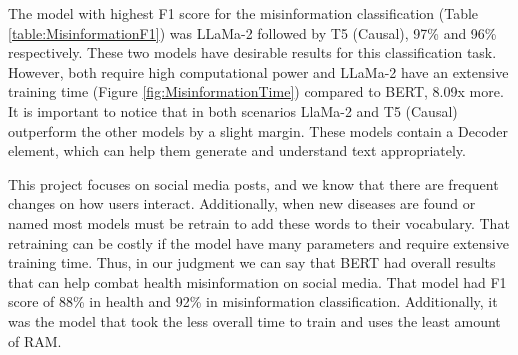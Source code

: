 The model with highest F1 score for the misinformation classification (Table \ref{table:MisinformationF1}) was LLaMa-2 followed by T5 (Causal), 97\% and 96\% respectively. These two models
have desirable results for this classification task. However, both require high computational power and LLaMa-2 have an extensive training time (Figure \ref{fig:MisinformationTime}) compared to BERT,
8.09x more. It is important to notice that in both scenarios LlaMa-2 and T5 (Causal) outperform the other models by a slight margin. These models contain a Decoder element, which can help them
generate and understand text appropriately.

This project focuses on social media posts, and we know that there are frequent changes on how users interact. Additionally, when new diseases are found or named most models must be
retrain to add these words to their vocabulary. That retraining can be costly if the model have many parameters and require extensive training time. Thus, in our judgment we can say that
BERT had overall results that can help combat health misinformation on social media. That model had F1 score of 88\% in health and 92\% in misinformation classification. Additionally, 
it was the model that took the less overall time to train and uses the least amount of RAM. 










